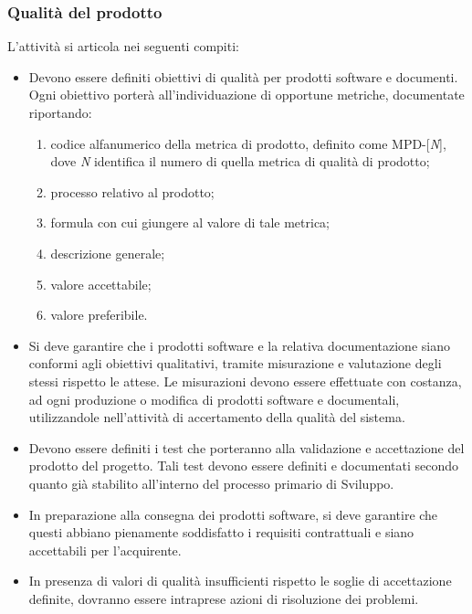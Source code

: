 \subsubsection{Qualità del prodotto}
L'attività si articola nei seguenti compiti:
\begin{itemize}
    \item Devono essere definiti obiettivi di qualità per prodotti software e documenti. Ogni obiettivo porterà all'individuazione di opportune metriche, documentate riportando:
    \begin{enumerate}
        \item codice alfanumerico della metrica di prodotto, definito come MPD-[\textit{N}], dove \textit{N} identifica il numero di quella metrica di qualità di prodotto;
        \item processo relativo al prodotto;
        \item formula con cui giungere al valore di tale metrica;
        \item descrizione generale;
        \item valore accettabile;
        \item valore preferibile.
    \end{enumerate}
    \item Si deve garantire che i prodotti software e la relativa documentazione siano conformi agli obiettivi qualitativi, tramite misurazione e valutazione degli stessi rispetto le attese. Le misurazioni devono essere effettuate con costanza, ad ogni produzione o modifica di prodotti software e documentali, utilizzandole nell'attività di accertamento della qualità del sistema.
    \item Devono essere definiti i test che porteranno alla validazione e accettazione del prodotto del progetto. Tali test devono essere definiti e documentati secondo quanto già stabilito all'interno del processo primario di Sviluppo.
    \item In preparazione alla consegna dei prodotti software, si deve garantire che questi abbiano pienamente soddisfatto i requisiti contrattuali e siano accettabili per l'acquirente.
    \item In presenza di valori di qualità insufficienti rispetto le soglie di accettazione definite, dovranno essere intraprese azioni di risoluzione dei problemi.
\end{itemize}


